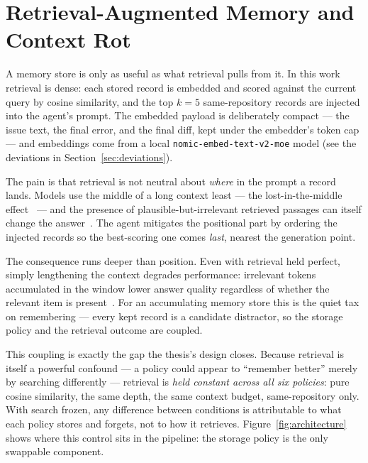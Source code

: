 

\section{Retrieval-Augmented Memory and Context Rot}

A memory store is only as useful as what retrieval pulls from it. In this work retrieval is
dense: each stored record is embedded and scored against the current query by cosine
similarity, and the top $k=5$ same-repository records are injected into the agent's prompt.
The embedded payload is deliberately compact --- the issue text, the final error, and the
final diff, kept under the embedder's token cap --- and embeddings come from a local
\texttt{nomic-embed-text-v2-moe} model (see the deviations in Section~\ref{sec:deviations}).

The pain is that retrieval is not neutral about \emph{where} in the prompt a record lands.
Models use the middle of a long context least --- the lost-in-the-middle
effect~\cite{liu2024} --- and the presence of plausible-but-irrelevant retrieved passages
can itself change the answer~\cite{cuconasu2024}. The agent mitigates the positional part
by ordering the injected records so the best-scoring one comes \emph{last}, nearest the
generation point.

The consequence runs deeper than position. Even with retrieval held perfect, simply
lengthening the context degrades performance: irrelevant tokens accumulated in the window
lower answer quality regardless of whether the relevant item is present~\cite{du2025}. For
an accumulating memory store this is the quiet tax on remembering --- every kept record is
a candidate distractor, so the storage policy and the retrieval outcome are coupled.

This coupling is exactly the gap the thesis's design closes. Because retrieval is itself a
powerful confound --- a policy could appear to ``remember better'' merely by searching
differently --- retrieval is \emph{held constant across all six policies}: pure cosine
similarity, the same depth, the same context budget, same-repository only. With search
frozen, any difference between conditions is attributable to what each policy stores and
forgets, not to how it retrieves. Figure~\ref{fig:architecture} shows where this control
sits in the pipeline: the storage policy is the only swappable component.
